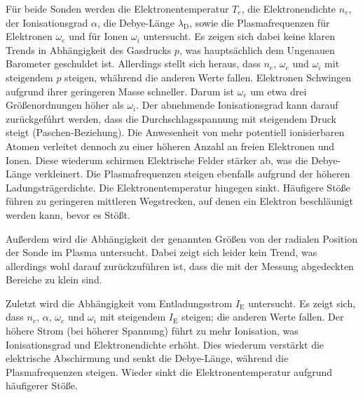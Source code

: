 F\"ur beide Sonden werden die Elektronentemperatur $T_e$, die Elektronendichte $n_e$, der Ionisationsgrad $\alpha$, die Debye-L\"ange $\lambda_\text{D}$, sowie die Plasmafrequenzen f\"ur Elektronen $\omega_e$ und f\"ur Ionen $\omega_i$ untersucht.
Es zeigen sich dabei keine klaren Trends in Abh\"angigkeit des Gasdrucks $p$, was haupts\"achlich dem Ungenauen Barometer geschuldet ist.
Allerdings stellt sich heraus, dass $n_e$, $\omega_e$ und $\omega_i$ mit steigendem $p$ steigen, wh\"ahrend die anderen Werte fallen.
Elektronen Schwingen aufgrund ihrer geringeren Masse schneller.
Darum ist $\omega_e$ um etwa drei Gr\"o\ss enordnungen h\"oher als $\omega_i$.
Der abnehmende Ionisationsgrad kann darauf zur\"uckgef\'uhrt werden, dass die Durchschlagsspannung mit steigendem Druck steigt (Paschen-Beziehung).
Die Anwesenheit von mehr potentiell ionisierbaren Atomen verleitet dennoch zu einer h\"oheren Anzahl an freien Elektronen und Ionen.
Diese wiederum schirmen Elektrische Felder st\"arker ab, was die Debye-L\"ange verkleinert.
Die Plasmafrequenzen steigen ebenfalls aufgrund der h\"oheren Ladungstr\"agerdichte.
Die Elektronentemperatur hingegen sinkt.
H\"aufigere St\"o\ss e f\"uhren zu geringeren mittleren Wegstrecken, auf denen ein Elektron beschl\"aunigt werden kann, bevor es St\"o\ss t.

Au\ss erdem wird die Abh\"angigkeit der genannten Gr\"o\ss en von der radialen Position der Sonde im Plasma untersucht.
Dabei zeigt sich leider kein Trend, was allerdings wohl darauf zur\"uckzuf\"uhren ist, dass die mit der Messung abgedeckten Bereiche zu klein sind.

Zuletzt wird die Abh\"angigkeit vom Entladungsstrom $I_\text{E}$ untersucht.
Es zeigt sich, dass $n_e$, $\alpha$, $\omega_e$ und $\omega_i$ mit steigendem $I_\text{E}$ steigen; die anderen Werte fallen.
Der h\"ohere Strom (bei h\"oherer Spannung) f\"uhrt zu mehr Ionisation, was Ionisationsgrad und Elektronendichte erh\"oht.
Dies wiederum verst\"arkt die elektrische Abschirmung und senkt die Debye-L\"ange, w\"ahrend die Plasmafrequenzen steigen.
Wieder sinkt die Elektronentemperatur aufgrund h\"aufigerer St\"o\ss e.
